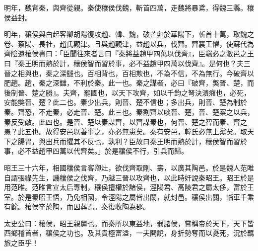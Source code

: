 \begin{pinyinscope}
明年，魏背秦，與齊從親。秦使穰侯伐魏，斬首四萬，走魏將暴鳶，得魏三縣。穰侯益封。

明年，穰侯與白起客卿胡陽復攻趙、韓、魏，破芒卯於華陽下，斬首十萬，取魏之卷、蔡陽、長社，趙氏觀津。且與趙觀津，益趙以兵，伐齊。齊襄王懼，使蘇代為齊陰遺穰侯書曰：「臣聞往來者言曰『秦將益趙甲四萬以伐齊』，臣竊必之敝邑之王曰『秦王明而熟於計，穰侯智而習於事，必不益趙甲四萬以伐齊』。是何也？夫三晉之相與也，秦之深讎也。百相背也，百相欺也，不為不信，不為無行。今破齊以肥趙。趙，秦之深讎，不利於秦。此一也。秦之謀者，必曰『破齊，獘晉、楚，而後制晉、楚之勝』。夫齊，罷國也，以天下攻齊，如以千鈞之弩決潰癕也，必死，安能獘晉、楚？此二也。秦少出兵，則晉、楚不信也；多出兵，則晉、楚為制於秦。齊恐，不走秦，必走晉、楚。此三也。秦割齊以啖晉、楚，晉、楚案之以兵，秦反受敵。此四也。是晉、楚以秦謀齊，以齊謀秦也，何晉、楚之智而秦、齊之愚？此五也。故得安邑以善事之，亦必無患矣。秦有安邑，韓氏必無上黨矣。取天下之腸胃，與出兵而懼其不反也，孰利？臣故曰秦王明而熟於計，穰侯智而習於事，必不益趙甲四萬以代齊矣。」於是穰侯不行，引兵而歸。

昭王三十六年，相國穰侯言客卿灶，欲伐齊取剛、壽，以廣其陶邑。於是魏人范睢自謂張祿先生，譏穰侯之伐齊，乃越三晉以攻齊也，以此時奸說秦昭王。昭王於是用范睢。范睢言宣太后專制，穰侯擅權於諸侯，涇陽君、高陵君之屬太侈，富於王室。於是秦昭王悟，乃免相國，令涇陽之屬皆出關，就封邑。穰侯出關，輜車千乘有餘。穰侯卒於陶，而因葬焉。秦復收陶為郡。

太史公曰：穰侯，昭王親舅也。而秦所以東益地，弱諸侯，嘗稱帝於天下，天下皆西鄉稽首者，穰侯之功也。及其貴極富溢，一夫開說，身折勢奪而以憂死，況於羈旅之臣乎！


\end{pinyinscope}
